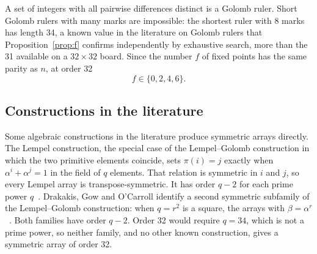 \documentclass[11pt,a4paper]{article}
\theoremstyle{definition}
\begin{document}
A set of integers with all pairwise differences distinct is a Golomb ruler. Short
Golomb rulers with many marks are impossible: the shortest ruler with 8 marks has length 34, a known value in the literature on Golomb
rulers that Proposition~\ref{prop:f} confirms independently by exhaustive search,
more than the 31 available on a $32\times32$ board. Since the number $f$ of fixed points has
the same parity as $n$, at order 32
\[
f\in\{0,2,4,6\}.
\]

\subsection{Constructions in the literature}
Some algebraic constructions in the literature produce symmetric arrays directly. The Lempel
construction, the special case of the Lempel--Golomb construction in which the two primitive
elements coincide, sets $\pi(i)=j$ exactly when $\alpha^i+\alpha^j=1$ in the field of $q$
elements. That relation is symmetric in $i$ and $j$, so every Lempel array is
transpose-symmetric. It has order $q-2$ for each prime power $q$~\cite{golombtaylor1984}.
Drakakis, Gow and O'Carroll identify a second symmetric subfamily of the Lempel--Golomb
construction: when $q=r^2$ is a square, the arrays with $\beta=\alpha^r$~\cite{dgo2006}. Both
families have order $q-2$. Order 32 would require $q=34$, which is not a prime power, so neither
family, and no other known construction, gives a symmetric array of order 32.
\end{document}
